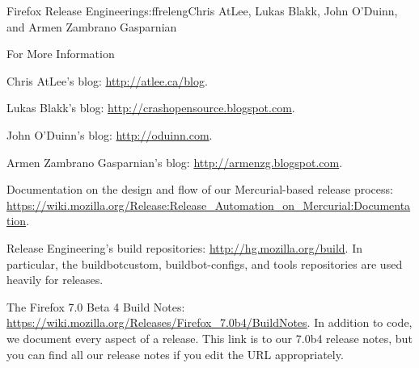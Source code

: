 \begin{aosachapter}{Firefox Release Engineering}{s:ffreleng}{Chris AtLee, Lukas Blakk, John O'Duinn, and Armen Zambrano Gasparnian}
\begin{aosasect1}{For More Information}
\begin{aosaitemize}  

\item Chris AtLee's blog: \url{http://atlee.ca/blog}.

\item Lukas Blakk's blog: \url{http://crashopensource.blogspot.com}.

\item John O'Duinn's blog: \url{http://oduinn.com}.

\item Armen Zambrano Gasparnian's blog: \url{http://armenzg.blogspot.com}.

\item Documentation on the design and flow of our Mercurial-based release process: \url{https://wiki.mozilla.org/Release:Release_Automation_on_Mercurial:Documentation}.

\item Release Engineering's build repositories:
  \url{http://hg.mozilla.org/build}.  In particular, the
  buildbotcustom, buildbot-configs, and tools repositories are used
  heavily for releases.

\item The Firefox 7.0 Beta 4 Build Notes:
  \url{https://wiki.mozilla.org/Releases/Firefox_7.0b4/BuildNotes}.
  In addition to code, we document every aspect of a release. This
  link is to our 7.0b4 release notes, but you can find all our release
  notes if you edit the URL appropriately.

\end{aosaitemize}

\end{aosasect1}

\end{aosachapter}
